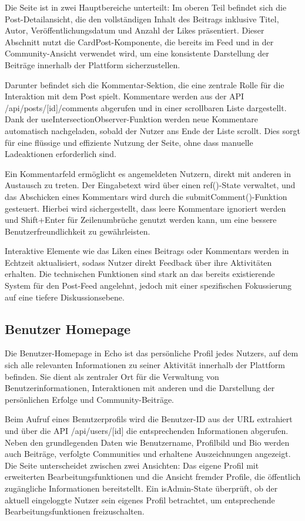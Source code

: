 \documentclass[a4paper,12pt]{article}
\begin{document}
Die Seite ist in zwei Hauptbereiche unterteilt: Im oberen Teil befindet sich
die Post-Detailansicht, die den vollständigen Inhalt des Beitrags inklusive
Titel, Autor, Veröffentlichungsdatum und Anzahl der Likes präsentiert. Dieser
Abschnitt nutzt die CardPost-Komponente, die bereits im Feed und in der
Community-Ansicht verwendet wird, um eine konsistente Darstellung der Beiträge
innerhalb der Plattform sicherzustellen.

Darunter befindet sich die Kommentar-Sektion, die eine zentrale Rolle für die
Interaktion mit dem Post spielt. Kommentare werden aus der API
/api/posts/[id]/comments abgerufen und in einer scrollbaren Liste dargestellt.
Dank der useIntersectionObserver-Funktion werden neue Kommentare automatisch
nachgeladen, sobald der Nutzer ans Ende der Liste scrollt. Dies sorgt für eine
flüssige und effiziente Nutzung der Seite, ohne dass manuelle Ladeaktionen
erforderlich sind.

Ein Kommentarfeld ermöglicht es angemeldeten Nutzern, direkt mit anderen in
Austausch zu treten. Der Eingabetext wird über einen ref()-State verwaltet, und
das Abschicken eines Kommentars wird durch die submitComment()-Funktion
gesteuert. Hierbei wird sichergestellt, dass leere Kommentare ignoriert werden
und Shift+Enter für Zeilenumbrüche genutzt werden kann, um eine bessere
Benutzerfreundlichkeit zu gewährleisten.

Interaktive Elemente wie das Liken eines Beitrags oder Kommentars werden in
Echtzeit aktualisiert, sodass Nutzer direkt Feedback über ihre Aktivitäten
erhalten. Die technischen Funktionen sind stark an das bereits existierende
System für den Post-Feed angelehnt, jedoch mit einer spezifischen Fokussierung
auf eine tiefere Diskussionsebene.

\subsection{Benutzer Homepage}
Die Benutzer-Homepage in Echo ist das persönliche Profil jedes Nutzers, auf dem
sich alle relevanten Informationen zu seiner Aktivität innerhalb der Plattform
befinden. Sie dient als zentraler Ort für die Verwaltung von
Benutzerinformationen, Interaktionen mit anderen und die Darstellung der
persönlichen Erfolge und Community-Beiträge.

Beim Aufruf eines Benutzerprofils wird die Benutzer-ID aus der URL extrahiert
und über die API /api/users/[id] die entsprechenden Informationen abgerufen.
Neben den grundlegenden Daten wie Benutzername, Profilbild und Bio werden auch
Beiträge, verfolgte Communities und erhaltene Auszeichnungen angezeigt. Die
Seite unterscheidet zwischen zwei Ansichten: Das eigene Profil mit erweiterten
Bearbeitungsfunktionen und die Ansicht fremder Profile, die öffentlich
zugängliche Informationen bereitstellt. Ein isAdmin-State überprüft, ob der
aktuell eingeloggte Nutzer sein eigenes Profil betrachtet, um entsprechende
Bearbeitungsfunktionen freizuschalten.
\end{document}
